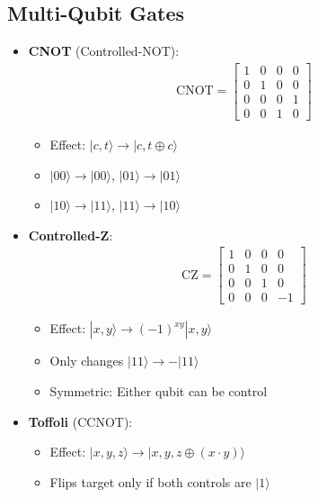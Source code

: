 \begin{multicols}{3}
\section*{Multi-Qubit Gates}
\begin{itemize}[leftmargin=*,nosep,topsep=0pt]
    \item \textbf{CNOT} (Controlled-NOT):
    \begin{align*}
        \text{CNOT} = \begin{bmatrix}
            1 & 0 & 0 & 0 \\
            0 & 1 & 0 & 0 \\
            0 & 0 & 0 & 1 \\
            0 & 0 & 1 & 0
        \end{bmatrix}
    \end{align*}
    \begin{itemize}[nosep]
        \item Effect: $|c,t\rangle \rightarrow |c, t \oplus c\rangle$
        \item $|00\rangle \to |00\rangle$, $|01\rangle \to |01\rangle$
        \item $|10\rangle \to |11\rangle$, $|11\rangle \to |10\rangle$
    \end{itemize}

    \item \textbf{Controlled-Z}:
    \begin{align*}
        \text{CZ} = \begin{bmatrix}
            1 & 0 & 0 & 0 \\
            0 & 1 & 0 & 0 \\
            0 & 0 & 1 & 0 \\
            0 & 0 & 0 & -1
        \end{bmatrix}
    \end{align*}
    \begin{itemize}[nosep]
        \item Effect: $|x,y\rangle \to (-1)^{xy}|x,y\rangle$
        \item Only changes $|11\rangle \to -|11\rangle$
        \item Symmetric: Either qubit can be control
    \end{itemize}

    \item \textbf{Toffoli} (CCNOT):
    \begin{itemize}[nosep]
        \item Effect: $|x,y,z\rangle \to |x,y,z \oplus (x \cdot y)\rangle$
        \item Flips target only if both controls are $|1\rangle$
    \end{itemize}


\end{itemize}
\end{multicols}
